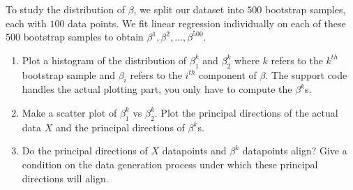 \documentclass[12pt,twoside]{article}
\begin{document}
\begin{enumerate}
To study the distribution of $\beta$, we split our dataset into $500$ bootstrap samples, each with $100$ data points. We fit linear regression individually on each of these $500$ bootstrap samples to obtain $\beta^1, \beta^2, \dots, \beta^{500}$.
\begin{enumerate}
\item Plot a histogram of the distribution of $\beta_1^k$ and $\beta_2^k$ where $k$ refers to the $k^{th}$ bootstrap sample and $\beta_i$ refers to the $i^{th}$ component of $\beta$.  The support code handles the actual plotting part, you only have to compute the $\beta^k$s. 
\item Make a scatter plot of $\beta_1^k$ vs $\beta_2^k$. Plot the principal directions of the actual data $X$ and the principal directions of $\beta^k$s. 
\item Do the principal directions of $X$ datapoints and $\beta^k$ datapoints align? Give a condition on the data generation process under which these principal directions will align. 
\end{enumerate}
\end{enumerate}
\end{document}
